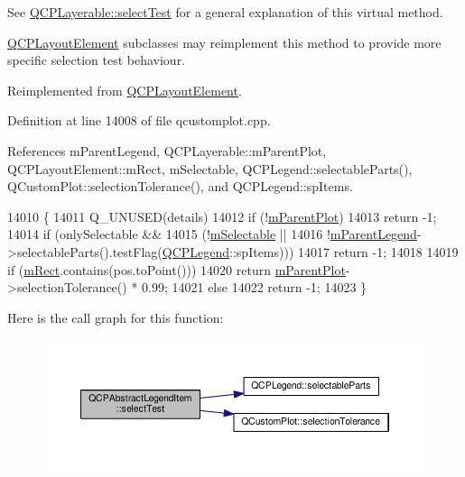 See \hyperlink{class_q_c_p_layerable_a4001c4d0dfec55598efa4d531f2179a9}{Q\+C\+P\+Layerable\+::select\+Test} for a general explanation of this virtual method.

\hyperlink{class_q_c_p_layout_element}{Q\+C\+P\+Layout\+Element} subclasses may reimplement this method to provide more specific selection test behaviour. 

Reimplemented from \hyperlink{class_q_c_p_layout_element_a9fcf5d0ea19f2c23b2b528bce2c6f095}{Q\+C\+P\+Layout\+Element}.



Definition at line 14008 of file qcustomplot.\+cpp.



References m\+Parent\+Legend, Q\+C\+P\+Layerable\+::m\+Parent\+Plot, Q\+C\+P\+Layout\+Element\+::m\+Rect, m\+Selectable, Q\+C\+P\+Legend\+::selectable\+Parts(), Q\+Custom\+Plot\+::selection\+Tolerance(), and Q\+C\+P\+Legend\+::sp\+Items.


\begin{DoxyCode}
14010                                                                   \{
14011   Q\_UNUSED(details)
14012   if (!\hyperlink{class_q_c_p_layerable_aa2a528433e44db02b8aef23c1f9f90ed}{mParentPlot})
14013     return -1;
14014   if (onlySelectable &&
14015       (!\hyperlink{class_q_c_p_abstract_legend_item_aa84029f57b1b32f642fb7db63c3fc2c2}{mSelectable} ||
14016        !\hyperlink{class_q_c_p_abstract_legend_item_aafcd9fc6fcb10f4a8d46037011afafe8}{mParentLegend}->selectableParts().testFlag(\hyperlink{class_q_c_p_legend}{QCPLegend}::spItems)))
14017     return -1;
14018 
14019   if (\hyperlink{class_q_c_p_layout_element_ad8896f05550389f7b9e92c9e6cdf6e01}{mRect}.contains(pos.toPoint()))
14020     return \hyperlink{class_q_c_p_layerable_aa2a528433e44db02b8aef23c1f9f90ed}{mParentPlot}->selectionTolerance() * 0.99;
14021   else
14022     return -1;
14023 \}
\end{DoxyCode}


Here is the call graph for this function\+:\nopagebreak
\begin{figure}[H]
\begin{center}
\leavevmode
\includegraphics[width=350pt]{class_q_c_p_abstract_legend_item_ad0480d5cad34627a294a2921caa4a62f_cgraph}
\end{center}
\end{figure}


